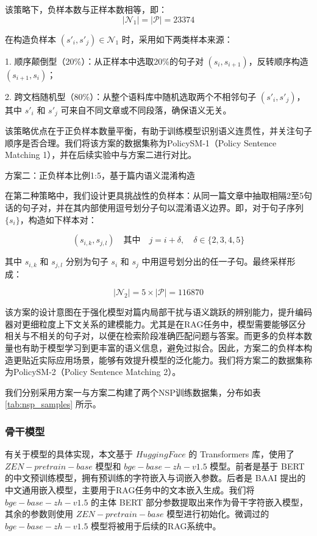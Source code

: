 \documentclass[12pt, a4paper]{ctexart}
\begin{document}
该策略下，负样本数与正样本数相等，即：
\begin{equation}
|\mathcal{N}_1| = |\mathcal{P}| = 23374
\end{equation}

在构造负样本 $(s'_i, s'_j) \in \mathcal{N}_1$ 时，采用如下两类样本来源：

1. 顺序颠倒型（20\%）：从正样本中选取20\%的句子对 $(s_i, s_{i+1})$，反转顺序构造 $(s_{i+1}, s_i)$；

2. 跨文档随机型（80\%）：从整个语料库中随机选取两个不相邻句子 $(s'_i, s'_j)$，其中 $s'_i$ 和 $s'_j$ 可来自不同文章或不同段落，确保语义无关。

该策略优点在于正负样本数量平衡，有助于训练模型识别语义连贯性，并关注句子顺序是否合理。我们将该方案的数据集称为PolicySM-1（Policy Sentence Matching 1），并在后续实验中与方案二进行对比。

方案二：正负样本比例1:5，基于篇内语义混淆构造

在第二种策略中，我们设计更具挑战性的负样本：从同一篇文章中抽取相隔2至5句话的句子对，并在其内部使用逗号划分子句以混淆语义边界。即，对于句子序列 $\{s_i\}$，构造如下样本对：

\begin{equation}
(s_{i,k}, s_{j,l}) \quad \text{其中} \quad j = i + \delta,\quad \delta \in \{2, 3, 4, 5\}
\end{equation}

其中 $s_{i,k}$ 和 $s_{j,l}$ 分别为句子 $s_i$ 和 $s_j$ 中用逗号划分出的任一子句。最终采样形成：

\begin{equation}
|\mathcal{N}_2| = 5 \times |\mathcal{P}| = 116870
\end{equation}

该方案的设计意图在于强化模型对篇内局部干扰与语义跳跃的辨别能力，提升编码器对更细粒度上下文关系的建模能力。尤其是在RAG任务中，模型需要能够区分相关与不相关的句子对，以便在检索阶段准确匹配问题与答案。而更多的负样本数量也有助于模型学习到更丰富的语义信息，避免过拟合。因此，方案二的负样本构造更贴近实际应用场景，能够有效提升模型的泛化能力。我们将方案二的数据集称为PolicySM-2（Policy Sentence Matching 2）。

我们分别采用方案一与方案二构建了两个NSP训练数据集，分布如表 \ref{tab:nsp_samples} 所示。

\subsubsection{骨干模型}
有关于模型的具体实现，本文基于 $Hugging Face$ 的 Transformers 库，使用了 $ZEN-pretrain-base$ 模型和 $bge-base-zh-v1.5$ 模型。前者是基于 BERT 的中文预训练模型，拥有预训练的字符嵌入与词嵌入参数。后者是 BAAI 提出的中文通用嵌入模型，主要用于RAG任务中的文本嵌入生成。我们将 $bge-base-zh-v1.5$ 的主体 BERT 部分参数提取出来作为骨干字符嵌入模型，其余的参数则使用 $ZEN-pretrain-base$ 模型进行初始化。微调过的 $bge-base-zh-v1.5$ 模型将被用于后续的RAG系统中。
\end{document}
